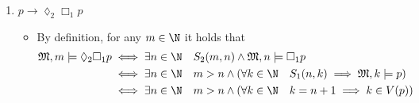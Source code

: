 \documentclass[a4paper, 12pt]{report}
\begin{document}
{\begin{enumerate}[label=(\alph*)]
\begin{itemize}
                        \begin{equation*}
                            \begin{split}
                                \mathfrak M', s \models \lozenge_1 \Box_2 p &\iff \exists t \in \mathbb B \quad R_1(s, t) \land \mathfrak M', t \models \Box_2 p \\
                                                                           &\iff \exists t \in \mathbb B \quad (t = s0 \lor t = s1) \land (\forall u \in \mathbb B \quad R_2(t, u) \implies \mathfrak M', u \models p) \\
                                                                           &\iff \exists t \in \mathbb B \quad (t = s0 \lor t = s1) \land (\forall u \in \mathbb B \quad u \sqsubset t \implies u \in V(p))
                            \end{split}
                        \end{equation*}
                        Now take $s = 00 \in \mathbb B$, and suppose $V(p) = \{s\} = \{00\}$; then $s \in V(p) \iff \mathfrak M', s \models p$, however if $t = s0$ or $t = s1$, there still is $u = 0$ such that $u = 0\sqsubset 00 = t$ even though $u = 0 \notin V(p)$, therefore $(t = s0 \lor t = s1) \implies (\exists u \in \mathbb B \quad u \sqsubset t \land u \notin V(p)) \iff \mathfrak M', s \not\models \lozenge_1 \Box_2 p$ which implies that the formula is not valid on $\mathcal B$.
                \end{itemize}
            \item $p \rightarrow \lozenge_2 \Box_1 p$
                \begin{itemize}
                    \item By definition, for any $m \in \N$ it holds that
                        \begin{equation*}
                            \begin{split}
                                \mathfrak M, m \models \lozenge_2 \Box_1 p &\iff \exists n \in \N \quad S_2(m, n) \land \mathfrak M, n \models \Box_1 p \\
                                                                           &\iff \exists n \in \N \quad m > n \land (\forall k \in \N \quad S_1(n, k) \implies \mathfrak M, k \models p) \\
                                                                           &\iff \exists n \in \N \quad m > n \land (\forall k \in \N \quad k = n + 1 \implies k \in V(p)) \\

\end{split}
\end{equation*}
\end{itemize}
\end{enumerate}}
\end{document}

